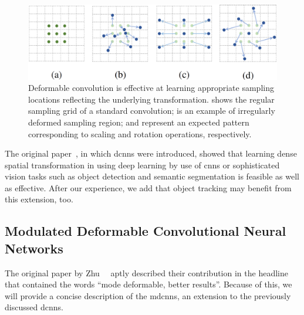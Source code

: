 \begin{figure}[t]
    \centerline{\includegraphics[width=0.7\linewidth]{figures/siamese_tracking/dcn_sampling_locations.png}}
    \caption[Various sampling locations in \glspl{dcnn}]{Deformable convolution is effective at learning appropriate sampling locations reflecting the underlying transformation.  shows the regular sampling grid of a standard convolution;  is an example of irregularly deformed sampling region;  and  represent an expected pattern corresponding to scaling and rotation operations, respectively. }
    \label{fig:SamplingLocationsDeformableCNN}
\end{figure}

The original paper~\cite{dai2017dcnn}, in which \glspl{dcnn} were introduced, showed that learning dense spatial transformation in using deep learning by use of \glspl{cnn} or sophisticated vision tasks such as object detection and semantic segmentation is feasible as well as effective. After our experience, we add that object tracking may benefit from this extension, too.

\subsection{Modulated Deformable Convolutional Neural Networks}
\label{ssec:ModulatedDeformableCNNs}

The original paper by Zhu~\etal{}~\cite{zhu2018mdcnn} aptly described their contribution in the headline that contained the words ``mode deformable, better results''. Because of this, we will provide a concise description of the \glspl{mdcnn}, an extension to the previously discussed \glspl{dcnn}.

